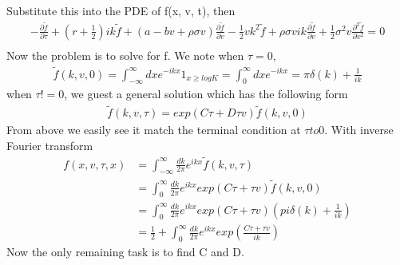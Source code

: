 \documentclass[a4paper]{article}
\begin{document}
Substitute this into the PDE of f(x, v, t), then
\begin{align*}
	-\frac{\partial \tilde f}{\partial \tau}
	+ (r + \frac{1}{2})ik \tilde f 
	+ (a-bv+\rho \sigma v)\frac{\partial \tilde f}{\partial v}
        -\frac{1}{2}vk^2 \tilde f 
	+ \rho \sigma v ik \frac{\partial \tilde f}{\partial v}
        +\frac{1}{2} \sigma^2 v \frac{\partial^2 \tilde f}{\partial v^2}  = 0\\
\end{align*}
Now the problem is to solve for f. We note when $\tau=0$,
\begin{align*}
	\tilde f(k, v, 0) = \int_{-\infty}^{\infty}dx e^{-ikx}1_{x \geq logK}
			     = \int_{0}^{\infty}dx e^{-ikx}
			     = \pi \delta(k) + \frac{1}{ik}
\end{align*}
when $\tau!=0$, we guest a general solution which has the following form
\begin{align*}
	\tilde f(k, v, \tau) = exp(C\tau +D\tau v) \tilde f(k,v,0)
\end{align*}
From above we easily see it match the terminal condition at $\tau to 0$. With inverse Fourier transform
\begin{align*}
	f(x, v, \tau, x) & = \int_{-\infty}^{\infty}\frac{dk}{2\pi} e^{ikx} \tilde f(k, v, \tau)\\
			 & = \int_{0}^{\infty}\frac{dk}{2\pi} e^{ikx} exp(C\tau + \tau v) \tilde f(k, v, 0)\\
			 & = \int_{0}^{\infty}\frac{dk}{2\pi} e^{ikx} exp(C\tau + \tau v) 
			 	(pi \delta(k) + \frac{1}{ik}) \\
			 & = \frac{1}{2} + \int_{0}^{\infty}\frac{dk}{2\pi} e^{ikx} exp(\frac{C\tau + \tau v}{ik}) 
\end{align*}
Now the only remaining task is to find C and D.
\end{document}
